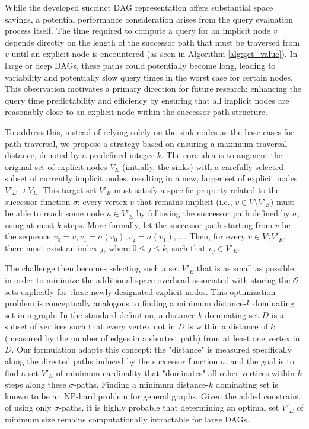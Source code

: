 While the developed succinct DAG representation offers substantial space savings, a potential performance consideration arises from the query evaluation process itself. The time required to compute a query for an implicit node $v$ depends directly on the length of the successor path that must be traversed from $v$ until an explicit node is encountered (as seen in Algorithm \ref{alg:get_value}). In large or deep DAGs, these paths could potentially become long, leading to variability and potentially slow query times in the worst case for certain nodes. This observation motivates a primary direction for future research: enhancing the query time predictability and efficiency by ensuring that all implicit nodes are reasonably close to an explicit node within the successor path structure.

To address this, instead of relying solely on the sink nodes as the base cases for path traversal, we propose a strategy based on ensuring a maximum traversal distance, denoted by a predefined integer $k$. The core idea is to augment the original set of explicit nodes $V_E$ (initially, the sinks) with a carefully selected subset of currently implicit nodes, resulting in a new, larger set of explicit nodes $V'_E \supseteq V_E$. This target set $V'_E$ must satisfy a specific property related to the successor function $\sigma$: every vertex $v$ that remains implicit (i.e., $v \in V \setminus V'_E$) must be able to reach some node $u \in V'_E$ by following the successor path defined by $\sigma$, using at most $k$ steps. More formally, let the successor path starting from $v$ be the sequence $v_0=v, v_1=\sigma(v_0), v_2=\sigma(v_1), \dots$. Then, for every $v \in V \setminus V'_E$, there must exist an index $j$, where $0 \le j \le k$, such that $v_j \in V'_E$.

The challenge then becomes selecting such a set $V'_E$ that is as small as possible, in order to minimize the additional space overhead associated with storing the $\mathcal{O}$-sets explicitly for these newly designated explicit nodes. This optimization problem is conceptually analogous to finding a minimum distance-$k$ dominating set in a graph. In the standard definition, a distance-$k$ dominating set $D$ is a subset of vertices such that every vertex not in $D$ is within a distance of $k$ (measured by the number of edges in a shortest path) from at least one vertex in $D$. Our formulation adapts this concept: the "distance" is measured specifically along the directed paths induced by the successor function $\sigma$, and the goal is to find a set $V'_E$ of minimum cardinality that "dominates" all other vertices within $k$ steps along these $\sigma$-paths. Finding a minimum distance-$k$ dominating set is known to be an NP-hard problem for general graphs. Given the added constraint of using only $\sigma$-paths, it is highly probable that determining an optimal set $V'_E$ of minimum size remains computationally intractable for large DAGs.

